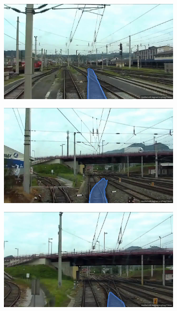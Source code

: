 \vspace{0.5cm}

\begin{figure}[H]
    \centering
    \begin{subfigure}{0.328\textwidth}
        \centering
        \includegraphics[width=\linewidth]{PICs/discussion/segmentanything2_weicheWeiter.jpg}
        \caption{}
        \label{fig:segmentanything2_a}
    \end{subfigure}
    \hfill
    \begin{subfigure}{0.328\textwidth}
        \centering
        \includegraphics[width=\linewidth]{PICs/discussion/segmentanything2_weicheWeg.jpg}
        \caption{}
        \label{fig:segmentanything2_b}
    \end{subfigure}
    \begin{subfigure}{0.328\textwidth}
        \centering
        \includegraphics[width=\linewidth]{PICs/discussion/segmentanything2_weicheWeg2.jpg}

\end{subfigure}
\end{figure}
